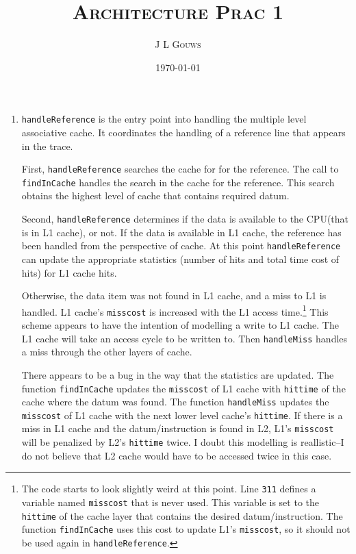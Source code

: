 \documentclass[12pt,a4]{article}
\title{
\textsc{Architecture Prac 1}
}
\author{\textsc{J L Gouws}
}
\date{\today
\\[1cm]}
\begin{document}
\thispagestyle{empty}

\maketitle

\begin{enumerate}
  \item
    \verb|handleReference| is the entry point into handling the multiple level associative cache.
    It coordinates the handling of a reference line that appears in the trace.

    First, \verb|handleReference| searches the cache for for the reference.
    The call to \verb|findInCache| handles the search in the cache for the reference.
    This search obtains the highest level of cache that contains required datum.

    Second, \verb|handleReference| determines if the data is available to the CPU(that is in L1 cache), or not.
    If the data is available in L1 cache, the reference has been handled from the perspective of cache.
    At this point \verb|handleReference| can update the appropriate statistics (number of hits and total time cost of hits) for L1 cache hits.

    Otherwise, the data item was not found in L1 cache, and a miss to L1 is handled.
    L1 cache's \verb|misscost| is increased with the L1 access time.\footnote{
      The code starts to look slightly weird at this point. 
      Line \verb|311| defines a variable named \verb|misscost| that is never used.
      This variable is set to the \verb|hittime| of the cache layer that contains the desired datum/instruction.
      The function \verb|findInCache| uses this cost to update L1's \verb|misscost|, so it should not be used again in \verb|handleReference|.
    }
    This scheme appears to have the intention of modelling a write to L1 cache.
    The L1 cache will take an access cycle to be written to.
    Then \verb|handleMiss| handles a miss through the other layers of cache.

    There appears to be a bug in the way that the statistics are updated.
    The function \verb|findInCache| updates the \verb|misscost| of L1 cache with \verb|hittime| of the cache where the datum was found.
    The function \verb|handleMiss| updates the \verb|misscost| of L1 cache with the next lower level cache's \verb|hittime|.
    If there is a miss in L1 cache and the datum/instruction is found in L2, L1's \verb|misscost| will be penalized by L2's \verb|hittime| twice.
    I doubt this modelling is reallistic--I do not believe that L2 cache would have to be accessed twice in this case.


\end{enumerate}
\end{document}
